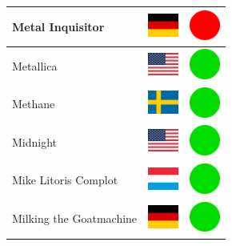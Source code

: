 \documentclass[12pt, a4paper, twoside]{report}
\begin{document}
\begin{center}
\begin{longtable}{|p{5cm}|p{2cm}|p{2cm}|}
Metal Inquisitor & \includegraphics[width=1cm]{4x3/de} & \includegraphics[width=1cm]{likes/n} \\ \hline
Metallica & \includegraphics[width=1cm]{4x3/us} & \includegraphics[width=1cm]{likes/y} \\ \hline
Methane & \includegraphics[width=1cm]{4x3/se} & \includegraphics[width=1cm]{likes/y} \\ \hline
Midnight & \includegraphics[width=1cm]{4x3/us} & \includegraphics[width=1cm]{likes/y} \\ \hline
Mike Litoris Complot & \includegraphics[width=1cm]{4x3/lu} & \includegraphics[width=1cm]{likes/y} \\ \hline
Milking the Goatmachine & \includegraphics[width=1cm]{4x3/de} & \includegraphics[width=1cm]{likes/y} \\ \hline

\end{longtable}
\end{center}
\end{document}
